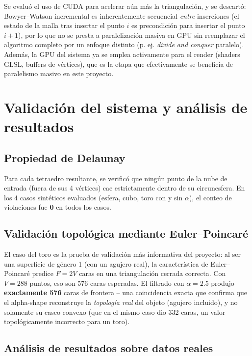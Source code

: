 \documentclass[12pt,a4paper]{article}
\begin{document}
Se evaluó el uso de CUDA para acelerar aún más la triangulación, y se
descartó: Bowyer--Watson incremental es inherentemente secuencial
\emph{entre} inserciones (el estado de la malla tras insertar el punto
$i$ es precondición para insertar el punto $i+1$), por lo que no se
presta a paralelización masiva en GPU sin reemplazar el algoritmo
completo por un enfoque distinto (p. ej. \emph{divide and conquer}
paralelo). Además, la GPU del sistema ya se emplea activamente para el
render (shaders GLSL, buffers de vértices), que es la etapa que
efectivamente se beneficia de paralelismo masivo en este proyecto.

\section{Validación del sistema y análisis de resultados}
\label{sec:validacion}

\subsection{Propiedad de Delaunay}

Para cada tetraedro resultante, se verificó que ningún punto de la nube
de entrada (fuera de sus 4 vértices) cae estrictamente dentro de su
circunesfera. En los 4 casos sintéticos evaluados (esfera, cubo, toro
con y sin $\alpha$), el conteo de violaciones fue \textbf{0} en todos
los casos.

\subsection{Validación topológica mediante Euler--Poincaré}

El caso del toro es la prueba de validación más informativa del
proyecto: al ser una superficie de género 1 (con un agujero real), la
característica de Euler--Poincaré predice $F=2V$ caras en una
triangulación cerrada correcta. Con $V=288$ puntos, eso son 576 caras
esperadas. El filtrado con $\alpha=2.5$ produjo \textbf{exactamente
576} caras de frontera -- una coincidencia exacta que confirma que el
alpha-shape reconstruye la \emph{topología real} del objeto (agujero
incluido), y no solamente su casco convexo (que en el mismo caso dio
332 caras, un valor topológicamente incorrecto para un toro).

\subsection{Análisis de resultados sobre datos reales}
\end{document}
